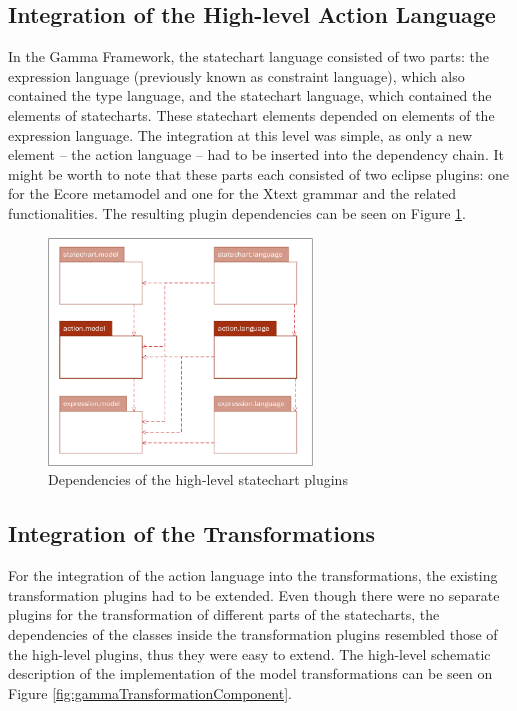 \subsection{Integration of the High-level Action Language}
In the Gamma Framework, the statechart language consisted of two parts: the expression language (previously known as constraint language), which also contained the type language, and the statechart language, which contained the elements of statecharts. These statechart elements depended on elements of the expression language. The integration at this level was simple, as only a new element -- the action language -- had to be inserted into the dependency chain. It might be worth to note that these parts each consisted of two eclipse plugins: one for the Ecore metamodel and one for the Xtext grammar and the related functionalities. The resulting plugin dependencies can be seen on Figure \ref{fig:gammaPackage}.

\begin{figure}[H]
	\centering
	\includegraphics[width=70mm, keepaspectratio]{figures/gammaPackage.png}
	\caption{Dependencies of the high-level statechart plugins}
	\label{fig:gammaPackage}
\end{figure}

\subsection{Integration of the Transformations}
For the integration of the action language into the transformations, the existing transformation plugins had to be extended. Even though there were no separate plugins for the transformation of different parts of the statecharts, the dependencies of the classes inside the transformation plugins resembled those of the high-level plugins, thus they were easy to extend. The high-level schematic description of the implementation of the model transformations can be seen on Figure \ref{fig:gammaTransformationComponent}.

